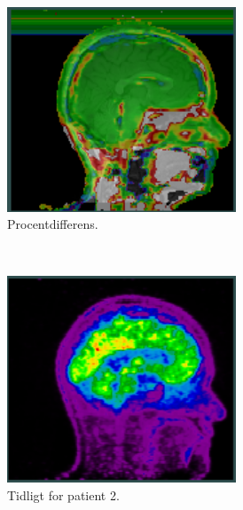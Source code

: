\begin{figure}[H]
\begin{subfigure}{0.3\textwidth}
        \includegraphics[width=0.75\textwidth]{colager/over_tid_pet/over_tid_121280_pd.png}
        \caption{Procentdifferens.}
        \label{col:over_time_pet_pat1_pd}
    \end{subfigure}\\
    \begin{subfigure}{0.3\textwidth}
        \centering
        \includegraphics[width=0.75\textwidth]{colager/over_tid_pet/over_tid_140547_early.png}
        \caption{Tidligt for patient 2.}
        \label{col:over_time_pet_pat2_early}
    \end{subfigure}\hfill
    \begin{subfigure}{0.3\textwidth}
        \centering

\end{subfigure}
\end{figure}
